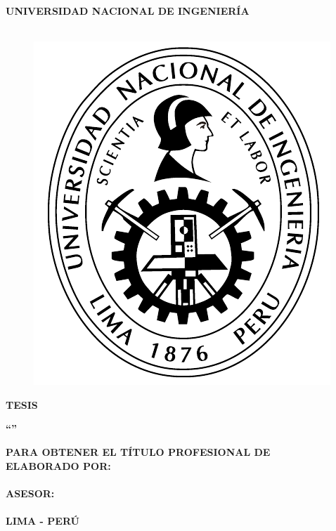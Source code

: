 \begin{titlepage}
	
	\begin{center}
		\vspace*{2 mm}
		{\LARGE \textbf{UNIVERSIDAD NACIONAL DE INGENIERÍA}}\\
		\vspace{5 mm}
		{\Large \textbf{\@facultad}}\\
		\vspace{5.5 mm}
		\begin{figure}[h]
			\centering 
			\includegraphics[scale=1]{E_IMAGENES/1_Caratula/UNI_LOGO1.pdf}
		\end{figure}
		\vspace{1 mm}	
		{\Large \textbf{TESIS} }\\
		\vspace{4 mm}
		
		\onehalfspacing  %
		{\Large \textbf{``{\@titlecaratula}''} }\\
		
		\singlespacing  %
		
		\vspace{5 mm}	
		{\large \textbf{PARA OBTENER EL TÍTULO PROFESIONAL DE {\@grado} } }\\
		\vspace{10 mm}
		{\large \textbf{ELABORADO POR:} }\\
		\vspace{4 mm}	
		{\large \textbf{\@authorcaratula} }\\
		\vspace{10 mm}
		{\large \textbf{ASESOR:} }\\
		\vspace{4 mm}	
		{\large \textbf{\@asesor} }\\
		\vspace{10 mm}	
		{\large \textbf{LIMA - PERÚ} }\\
		\vspace{4 mm}	
		{\large \textbf{\@yyearr} }\\


\end{center}
\end{titlepage}
